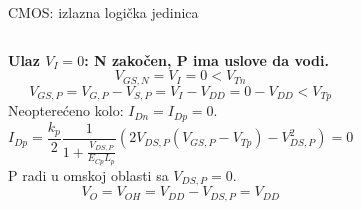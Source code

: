 \begin{frame}[label=09_2-s024]{CMOS: izlazna logička jedinica}
\begin{columns}[T,onlytextwidth]\centering {}\textbf{Ulaz $V_I=0$: N zakočen, P ima uslove da vodi.}\[V_{GS,N}=V_I=0<V_{Tn}\]
\[V_{GS,P}=V_{G,P}-V_{S,P}=V_I-V_{DD}=0-V_{DD}<V_{Tp}\]
Neopterećeno kolo: $I_{Dn}=I_{Dp}=0$.\[I_{Dp}=\frac{k_p}2\frac1{1+\frac{V_{DS,P}}{E_{Cp}L_p}}\left(2V_{DS,P}(V_{GS,P}-V_{Tp})-V_{DS,P}^2\right)=0\]
P radi u omskoj oblasti sa $V_{DS,P}=0$.\[V_O=V_{OH}=V_{DD}-V_{DS,P}=V_{DD}\]
\end{columns}
\end{frame}
